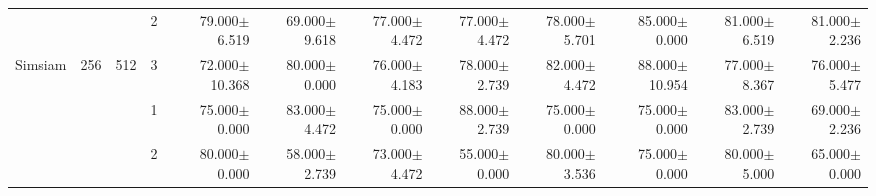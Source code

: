\begin{table}[htpb]
{\begin{tabular}{c|c|c|c|rr|rr|rr|rr}
                                 &                                                                                 &                                                                                        & 2                                                                                         & 79.000$\pm$6.519                        & 69.000$\pm$9.618                        & 77.000$\pm$4.472                        & 77.000$\pm$4.472                        & 78.000$\pm$5.701                         & 85.000$\pm$0.000                         & 81.000$\pm$6.519                        & 81.000$\pm$2.236                       \\
\multirow{-12}{*}{Simsiam}       & \multirow{-6}{*}{256}                                                           & \multirow{-3}{*}{512}                                                                  & 3                                                                                         & 72.000$\pm$10.368                       & 80.000$\pm$0.000                        & 76.000$\pm$4.183                        & 78.000$\pm$2.739                        & 82.000$\pm$4.472                         & 88.000$\pm$10.954                        & 77.000$\pm$8.367                        & 76.000$\pm$5.477                       \\ \hline
                                 &                                                                                 &                                                                                        & 1                                                                                         & 75.000$\pm$0.000                        & 83.000$\pm$4.472                        & 75.000$\pm$0.000                        & 88.000$\pm$2.739                        & 75.000$\pm$0.000                         & 75.000$\pm$0.000                         & 83.000$\pm$2.739                        & 69.000$\pm$2.236                       \\
                                 &                                                                                 &                                                                                        & 2                                                                                         & 80.000$\pm$0.000                        & 58.000$\pm$2.739                        & 73.000$\pm$4.472                        & 55.000$\pm$0.000                        & 80.000$\pm$3.536                         & 75.000$\pm$0.000                         & 80.000$\pm$5.000                        & 65.000$\pm$0.000                       \\

\end{tabular}}
\end{table}

